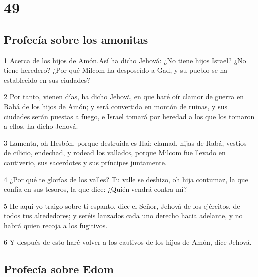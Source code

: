 \chapter{49}

\section*{Profecía sobre los amonitas}

\par 1 Acerca de los hijos de Amón.Así ha dicho Jehová: ¿No tiene hijos Israel? ¿No tiene heredero? ¿Por qué Milcom ha desposeído a Gad, y su pueblo se ha establecido en sus ciudades?
\par 2 Por tanto, vienen días, ha dicho Jehová, en que haré oír clamor de guerra en Rabá de los hijos de Amón; y será convertida en montón de ruinas, y sus ciudades serán puestas a fuego, e Israel tomará por heredad a los que los tomaron a ellos, ha dicho Jehová.
\par 3 Lamenta, oh Hesbón, porque destruida es Hai; clamad, hijas de Rabá, vestíos de cilicio, endechad, y rodead los vallados, porque Milcom fue llevado en cautiverio, sus sacerdotes y sus príncipes juntamente.
\par 4 ¿Por qué te glorías de los valles? Tu valle se deshizo, oh hija contumaz, la que confía en sus tesoros, la que dice: ¿Quién vendrá contra mí?
\par 5 He aquí yo traigo sobre ti espanto, dice el Señor, Jehová de los ejércitos, de todos tus alrededores; y seréis lanzados cada uno derecho hacia adelante, y no habrá quien recoja a los fugitivos.
\par 6 Y después de esto haré volver a los cautivos de los hijos de Amón, dice Jehová.

\section*{Profecía sobre Edom}

